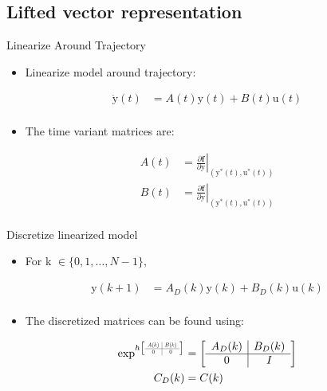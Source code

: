 \documentclass[handout]{beamer}
\newcommand{\boldvec}[1]{\boldsymbol{\mathrm{#1}}}
\let\vec\boldvec
\newcommand\at[2]{\left.#1\right|_{#2}} %
\newcommand\scalemath[2]{\scalebox{#1}{\mbox{\ensuremath{\displaystyle #2}}}} %
\newcommand{\state}{\vec{y}} %
\newcommand{\sysInput}{\vec{u}} %
\begin{document}
\subsection{Lifted vector representation}
%
\begin{frame}{Linearize Around Trajectory}
\begin{itemize}
\item Linearize model around trajectory: 
\end{itemize}
\begin{equation*}
\begin{aligned}
\dot{\state}(t) &= A(t)\state(t) + B(t)\sysInput(t) \\
\end{aligned}
\end{equation*} 
\begin{itemize}
\item The time variant matrices are: 
\linebreak
\end{itemize}
\begin{equation*}
\begin{aligned}
A(t) & = \at{\frac{\partial{\mathbf{f}}}{\partial{\state}}}{(\state^{*}(t),\sysInput^{*}(t))} \\
B(t) & = \at{\frac{\partial{\mathbf{f}}}{\partial{\state}}}{(\state^{*}(t),\sysInput^{*}(t))} \\
\end{aligned}
\end{equation*}
\end{frame}
%
\begin{frame}{Discretize linearized model}
\begin{itemize}
\item For k $\in \{ 0, 1, \ldots, N-1 \}$, 
\end{itemize}
\begin{equation*}
\begin{aligned}
\state(k+1) &= A_{D}(k)\state(k) + B_{D}(k)\sysInput(k) \\
\end{aligned}
\end{equation*}

\begin{itemize}
\item The discretized matrices can be found using: 
\linebreak
\end{itemize}
\begin{equation*}
\begin{aligned}
\exp^{h
\left[
\scalemath{0.5}{
\begin{array}{c|c}
A(k) & B(k) \\ \hline
0 & 0
\end{array}}\right]}
&= 
\left[
\begin{array}{c|c}
A_{D}(k) & B_{D}(k) \\ \hline
0 & I
\end{array}\right] \\
C_{D}(k) &= C(k)
\end{aligned}
\end{equation*}
\end{frame}
\end{document}
